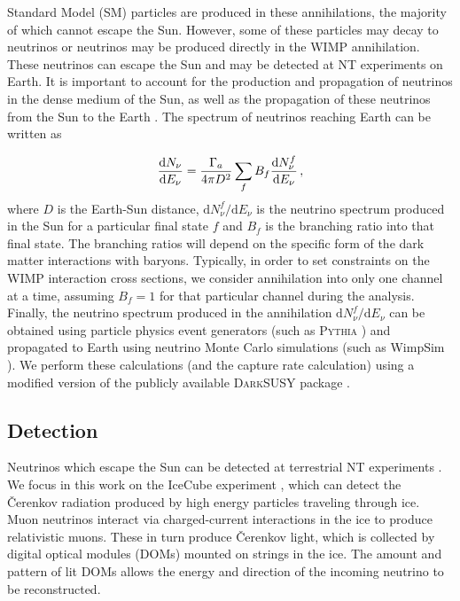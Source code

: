 Standard Model (SM) particles are produced in these annihilations, the majority of which cannot escape the Sun. However, some of these particles may decay to neutrinos or neutrinos may be produced directly in the WIMP annihilation. These neutrinos can escape the Sun and may be detected at NT experiments on Earth. It is important to account for the production and propagation of neutrinos in the dense medium of the Sun, as well as the propagation of these neutrinos from the Sun to the Earth \cite{Blennow:2008}. The spectrum of neutrinos reaching Earth can be written as

\begin{equation}
\frac{\mathrm{d}N_\nu}{\mathrm{d}E_\nu} = \frac{\Gamma_a}{4\pi D^2}\sum_f B_f \frac{\mathrm{d}N_\nu^f}{\mathrm{d}E_\nu}\,,
\end{equation}
where $D$ is the Earth-Sun distance, $\mathrm{d}N_\nu^f/\mathrm{d}E_\nu$ is the neutrino spectrum produced in the Sun for a particular final state $f$ and $B_f$ is the branching ratio into that final state. The branching ratios will depend on the specific form of the dark matter interactions with baryons. Typically, in order to set constraints on the WIMP interaction cross sections, we consider annihilation into only one channel at a time, assuming $B_f = 1$ for that particular channel during the analysis. Finally, the neutrino spectrum produced in the annihilation $\mathrm{d}N_\nu^f/\mathrm{d}E_\nu$ can be obtained using particle physics event generators (such as \textsc{Pythia} \cite{Sjostrand:1994}) and propagated to Earth using neutrino Monte Carlo simulations (such as WimpSim \cite{Blennow:2008}). We perform these calculations (and the capture rate calculation) using a modified version of the publicly available \textsc{DarkSUSY} package \cite{Gondolo:2004,DarkSUSYweb}.



\subsection{Detection}

Neutrinos which escape the Sun can be detected at terrestrial NT experiments \cite{Adrian-Martinez:2013,Aartsen:2013b}. We focus in this work on the IceCube experiment \cite{Abbasi:2009,Aartsen:2013b}, which can detect the \v{C}erenkov radiation produced by high energy particles traveling through ice. Muon neutrinos interact via charged-current interactions in the ice to produce relativistic muons. These in turn produce \v{C}erenkov light, which is collected by digital optical modules (DOMs) mounted on strings in the ice. The amount and pattern of lit DOMs allows the energy and direction of the incoming neutrino to be reconstructed.

